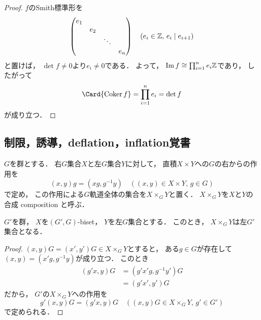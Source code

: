 \documentclass{jlreq}
\newcommand{\Term}[2][\relax]{%
	\textsf{#2} \if#1\relax\else{（\textsf{#1}）}\fi%
}
\DeclareMathOperator{\Cok}{Coker}
\DeclareMathOperator{\Image}{Im}
\begin{document}
	\begin{proof}
		$f$のSmith標準形を
		\begin{equation}
			\begin{pmatrix}
				e_1 &  &  &  \\
				& e_2 &  &  \\
				&  & \ddots &  \\
				&  &  & e_n
			\end{pmatrix} \quad (e_i \in \mathbb{Z},\, e_i \mid e_{i+1})
		\end{equation}
		と置けば，
		$\det f \ne 0$より$e_i \ne 0$である．
		よって，
		$\Image f \cong \prod_{i = 1}^n e_i \Z$であり，
		したがって
		\begin{equation}
			\Card{\Cok f}
			= \prod_{i = 1}^n e_i
			= \det f
		\end{equation}
		が成り立つ．
	\end{proof}
	
	\subsection{制限，誘導，deflation，inflation覚書}
	
	$G$を群とする．
	右$G$集合$X$と左$G$集合$Y$に対して，
	直積$X \times Y$への$G$の右からの作用を
	\begin{equation}
		(x, y) g
		= (xg, g^{-1}y) \quad ((x, y) \in X \times Y,\, g \in G)
	\end{equation}
	で定め，
	この作用による$G$軌道全体の集合を$X \times_G Y$と置く．
	$X \times_G Y$を$X$と$Y$の\Term[composition]{合成}と呼ぶ．
	
	\begin{proposition}
		$G'$を群，
		$X$を$(G', G)$-biset，
		$Y$を左$G$集合とする．
		このとき，
		$X \times_G Y$は左$G'$集合となる．
	\end{proposition}
	
	\begin{proof}
		$(x, y)G = (x', y')G \in X \times_G Y$とすると，
		ある$g \in G$が存在して$(x, y) = (x' g, g^{-1} y)$が成り立つ．
		このとき
		\begin{align}
			(g' x, y)G
			&= (g' x' g, g^{-1} y')G \\
			&= (g' x', y')G
		\end{align}
		だから，
		$G'$の$X \times_G Y$への作用を
		\begin{equation}
			g' (x, y)G
			= (g' x, y)G \quad ((x, y)G \in X \times_G Y,\, g' \in G')
		\end{equation}
		で定められる．
	\end{proof}
	
\end{document}

